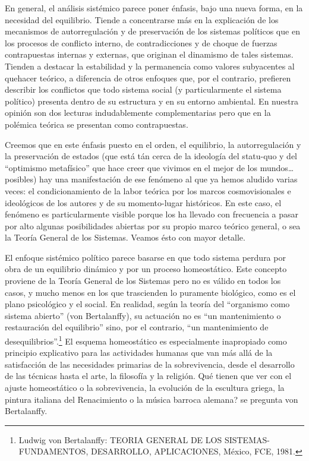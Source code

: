 \documentclass[
]{book}
\begin{document}
En general, el análisis sistémico parece poner énfasis, bajo una nueva forma, en la necesidad del equilibrio. Tiende a concentrarse más en la explicación de los mecanismos de autorregulación y de preservación de los sistemas políticos que en los procesos de conflicto interno, de contradicciones y de choque de fuerzas contrapuestas internas y externas, que originan el dinamismo de tales sistemas. Tienden a destacar la estabilidad y la permanencia como valores subyacentes al quehacer teórico, a diferencia de otros enfoques que, por el contrario, prefieren describir los conflictos que todo sistema social (y particularmente el sistema político) presenta dentro de su estructura y en su entorno ambiental. En nuestra opinión son dos lecturas indudablemente complementarias pero que en la polémica teórica se presentan como contrapuestas.

Creemos que en este énfasis puesto en el orden, el equilibrio, la autorregulación y la preservación de estados (que está tán cerca de la ideología del statu-quo y del ``optimismo metafísico'' que hace creer que vivimos en el mejor de los mundos\ldots posibles) hay una manifestación de ese fenómeno al que ya hemos aludido varias veces: el condicionamiento de la labor teórica por los marcos cosmovisionales e ideológicos de los autores y de su momento-lugar históricos. En este caso, el fenómeno es particularmente visible porque los ha llevado con frecuencia a pasar por alto algunas posibilidades abiertas por su propio marco teórico general, o sea la Teoría General de los Sistemas. Veamos ésto con mayor detalle.

El enfoque sistémico político parece basarse en que todo sistema perdura por obra de un equilibrio dinámico y por un proceso homeostático. Este concepto proviene de la Teoría General de los Sistemas pero no es válido en todos los casos, y mucho menos en los que trascienden lo puramente biológico, como es el plano psicológico y el social. En realidad, según la teoría del ``organismo como sistema abierto'' (von Bertalanffy), su actuación no es ``un mantenimiento o restauración del equilibrio'' sino, por el contrario, ``un mantenimiento de desequilibrios''.\footnote{Ludwig von Bertalanffy: TEORIA GENERAL DE LOS SISTEMAS- FUNDAMENTOS, DESARROLLO, APLICACIONES, México, FCE, 1981.} El esquema homeostático es especialmente inapropiado como principio explicativo para las actividades humanas que van más allá de la satisfacción de las necesidades primarias de la sobrevivencia, desde el desarrollo de las técnicas hasta el arte, la filosofía y la religión. Qué tienen que ver con el ajuste homeostático o la sobrevivencia, la evolución de la escultura griega, la pintura italiana del Renacimiento o la música barroca alemana? se pregunta von Bertalanffy.
\end{document}
